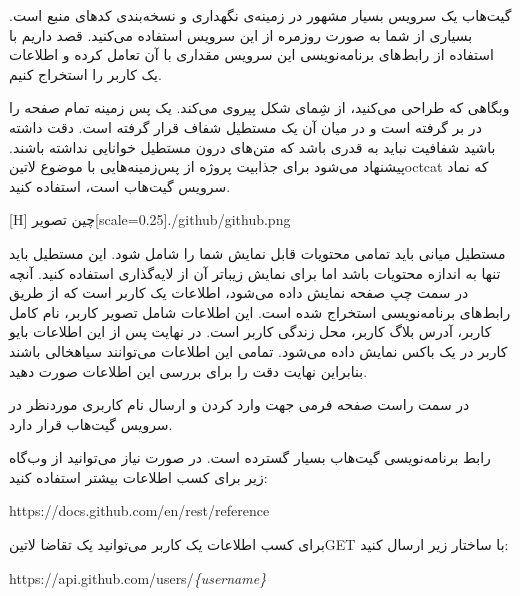 

گیت‌هاب یک سرویس بسیار مشهور در زمینه‌ی نگهداری و نسخه‌بندی کدهای منبع است. بسیاری از شما به صورت روزمره از این سرویس استفاده می‌کنید.
قصد داریم با استفاده از رابط‌های برنامه‌نویسی این سرویس مقداری با آن تعامل کرده و اطلاعات یک کاربر را استخراج کنیم.


وبگاهی که طراحی می‌کنید، از شِمای شکل  پیروی می‌کند. یک پس زمینه تمام صفحه را در بر گرفته است و در میان آن یک مستطیل شفاف قرار گرفته است.
دقت داشته باشید شفافیت نباید به قدری باشد که متن‌های درون مستطیل خوانایی نداشته باشند.
پیشنهاد می‌شود برای جذابیت پروژه از پس‌زمینه‌هایی با موضوع ‌لاتین{octcat} که نماد سرویس گیت‌هاب است، استفاده کنید.

[H]
   ‌چین
  ‌تصویر[scale=0.25]{./github/github.png}

مستطیل میانی باید تمامی محتویات قابل نمایش شما را شامل شود. این مستطیل باید تنها به اندازه محتویات باشد اما برای نمایش زیباتر آن از لایه‌گذاری استفاده کنید.
آنچه در سمت چپ صفحه نمایش داده می‌شود، اطلاعات یک کاربر است که از طریق رابط‌های برنامه‌نویسی استخراج شده است. این اطلاعات شامل تصویر کاربر،
نام کامل کاربر، آدرس بلاگ کاربر، محل زندگی کاربر است.
در نهایت پس از این اطلاعات بایو کاربر در یک باکس نمایش داده می‌شود.
تمامی این اطلاعات می‌توانند ‌سیاه{خالی} باشند بنابراین نهایت دقت را برای بررسی این اطلاعات صورت دهید.

در سمت راست صفحه فرمی جهت وارد کردن و ارسال نام کاربری موردنظر در سرویس گیت‌هاب قرار دارد.

رابط برنامه‌نویسی گیت‌هاب بسیار گسترده است. در صورت نیاز می‌توانید از وب‌گاه زیر برای کسب اطلاعات بیشتر استفاده کنید:

\begin{latin}\begin{center}
https://docs.github.com/en/rest/reference
\end{center}\end{latin}

برای کسب اطلاعات یک کاربر می‌توانید یک تقاضا ‌لاتین{GET} با ساختار زیر ارسال کنید:

\begin{latin}\begin{center}
https://api.github.com/users/\textit{\{username\}}
\end{center}\end{latin}

